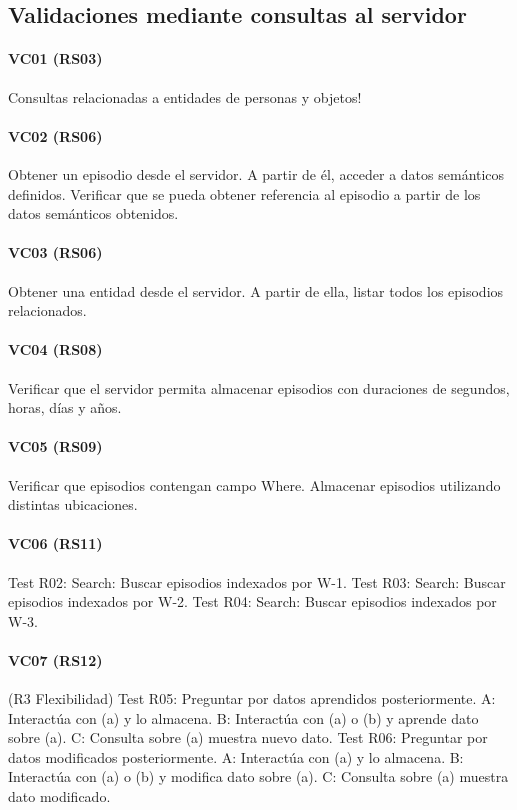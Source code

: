 \subsection{Validaciones mediante consultas al servidor}

\paragraph{VC01 (RS03)}
Consultas relacionadas a entidades de personas y objetos!

\paragraph{VC02 (RS06)}
Obtener un episodio desde el servidor. A partir de él, acceder a datos semánticos definidos. Verificar que se pueda obtener referencia al episodio a partir de los datos semánticos obtenidos.

\paragraph{VC03 (RS06)}
Obtener una entidad desde el servidor. A partir de ella, listar todos los episodios relacionados.

\paragraph{VC04 (RS08)}
Verificar que el servidor permita almacenar episodios con duraciones de segundos, horas, días y años.

\paragraph{VC05 (RS09)}
Verificar que episodios contengan campo Where. Almacenar episodios utilizando distintas ubicaciones.

\paragraph{VC06 (RS11)}
Test R02: Search: Buscar episodios indexados por W-1.
Test R03: Search: Buscar episodios indexados por W-2.
Test R04: Search: Buscar episodios indexados por W-3.


\paragraph{VC07 (RS12)}
(R3 Flexibilidad)
Test R05: Preguntar por datos aprendidos posteriormente.
A: Interactúa con (a) y lo almacena.
B: Interactúa con (a) o (b) y aprende dato sobre (a).
C: Consulta sobre (a) muestra nuevo dato.
Test R06: Preguntar por datos modificados posteriormente.
A: Interactúa con (a) y lo almacena.
B: Interactúa con (a) o (b) y modifica dato sobre (a).
C: Consulta sobre (a) muestra dato modificado.


